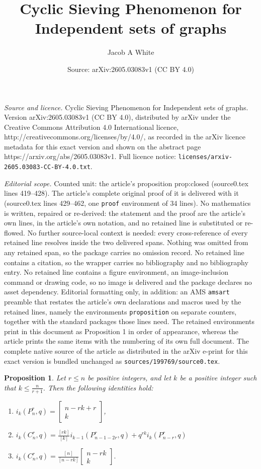 \documentclass[10pt,a4paper]{amsart}
\title{Cyclic Sieving Phenomenon for Independent sets of graphs}
\author{Jacob A White}
\date{Source: arXiv:2605.03083v1 (CC BY 4.0)}
\newtheorem{proposition}{Proposition}
\newcommand{\gau}[2]{\left[ \begin{array}{c} #1 \\ #2 \end{array} \right]}
\begin{document}
\maketitle

\noindent\emph{Source and licence.} Cyclic Sieving Phenomenon for Independent sets of graphs. Version arXiv:2605.03083v1 (CC BY 4.0), distributed by arXiv under the Creative Commons Attribution 4.0 International licence, http://creativecommons.org/licenses/by/4.0/, as recorded in the arXiv licence metadata for this exact version and shown on the abstract page https://arxiv.org/abs/2605.03083v1. Full licence notice: \texttt{licenses/arxiv-2605.03083-CC-BY-4.0.txt}.\par\smallskip

\noindent\textit{Editorial scope.} Counted unit: the article's proposition prop:closed (source0.tex lines 419--428). The article's complete original proof of it is delivered with it (source0.tex lines 429--462, one \texttt{proof} environment of 34 lines). No mathematics is written, repaired or re-derived: the statement and the proof are the article's own lines, in the article's own notation, and no retained line is substituted or re-flowed.  No further source-local context is needed: every cross-reference of every retained line resolves inside the two delivered spans.  Nothing was omitted from any retained span, so the package carries no omission record.  No retained line contains a citation, so the wrapper carries no bibliography and no bibliography entry.  No retained line contains a figure environment, an image-inclusion command or drawing code, so no image is delivered and the package declares no asset dependency.  Editorial formatting only, in addition: an AMS \texttt{amsart} preamble that restates the article's own declarations and macros used by the retained lines, namely the environments \texttt{proposition} on separate counters, together with the standard packages those lines need.  The retained environments print in this document as Proposition 1 in order of appearance, whereas the article prints the same items with the numbering of its own full document.  The complete native source of the article as distributed in the arXiv e-print for this exact version is bundled unchanged as \texttt{sources/199769/source0.tex}.
\begin{proposition}
Let $r \leq n$ be positive integers, and let $k$ be a positive integer such that $k \leq \frac{n}{r+1}.$
Then the following identities hold:
\begin{enumerate}
\item $i_k(P^r_n,q) = \gau{n-rk+r}{k}$,
\item $i_k(C_n^r, q) = \frac{[rk]}{[k]}i_{k-1}(P_{n-1-2r}^r,q)+q^{rk}i_k(P^r_{n-r},q)$ 
\item $i_k(C_n^r,q) = \frac{[n]}{[n-rk]}\gau{n-rk}{k}.$
\label{prop:closed}
\end{enumerate}
\end{proposition}
\end{document}
